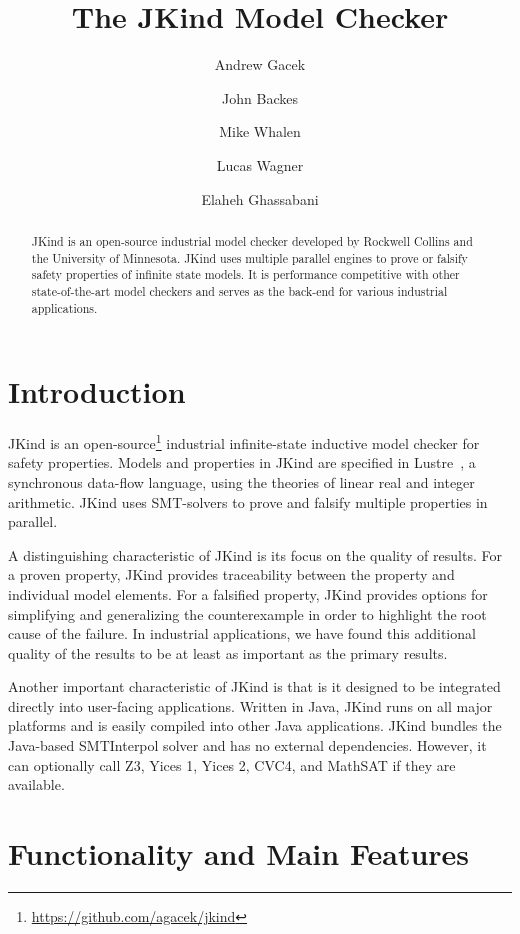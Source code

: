 \documentclass{llncs}
\title{The JKind Model Checker}
\author{
  Andrew Gacek\inst{1} \and
  John Backes\inst{1} \and
  Mike Whalen\inst{2} \and
  Lucas Wagner\inst{1} \and
  Elaheh Ghassabani\inst{2}}
\institute{
  Rockwell Collins \\
  \and
  University of Minnesota
}
\newcommand{\jkind}{{\sc JKind}\xspace}
\newcommand{\lustre}{{\sc Lustre}\xspace}
\begin{document}
\maketitle

\begin{abstract}
  \jkind is an open-source industrial model checker developed by
  Rockwell Collins and the University of Minnesota. \jkind uses
  multiple parallel engines to prove or falsify safety properties of
  infinite state models. It is performance competitive with other
  state-of-the-art model checkers and serves as the back-end for
  various industrial applications.
\end{abstract}

\section{Introduction}

\jkind is an
open-source\footnote{\url{https://github.com/agacek/jkind}} industrial
infinite-state inductive model checker for safety properties. Models
and properties in \jkind are specified in
\lustre~\cite{halbwachs1991ieee}, a synchronous data-flow language,
using the theories of linear real and integer arithmetic. \jkind uses
SMT-solvers to prove and falsify multiple properties in parallel.

A distinguishing characteristic of \jkind is its focus on the quality
of results. For a proven property, \jkind provides traceability
between the property and individual model elements. For a falsified
property, \jkind provides options for simplifying and generalizing the
counterexample in order to highlight the root cause of the failure. In
industrial applications, we have found this additional quality of the
results to be at least as important as the primary results.

Another important characteristic of \jkind is that is it designed to
be integrated directly into user-facing applications. Written in Java,
\jkind runs on all major platforms and is easily compiled into other
Java applications. \jkind bundles the Java-based {\sc SMTInterpol}
solver and has no external dependencies. However, it can optionally
call {\sc Z3}, {\sc Yices 1}, {\sc Yices 2}, {\sc CVC4}, and {\sc
  MathSAT} if they are available.

\section{Functionality and Main Features}
\end{document}
